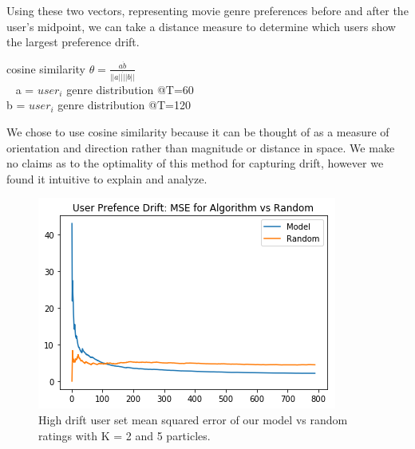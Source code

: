 \documentclass{article}
\begin{document}
Using these two vectors, representing movie genre preferences before and after the user's midpoint, we can take a distance measure to determine which users show the largest preference drift.

\begin{center}
cosine similarity $\theta = \frac{a \dot b}{||a|| \dot ||b||}$ \\
\ \newline
a = $user_i$ genre distribution @T=60 \\
b = $user_i$ genre distribution @T=120 \\
\end{center}

We chose to use cosine similarity because it can be thought of as a measure of orientation and direction rather than magnitude or distance in space. We make no claims as to the optimality of this method for capturing drift, however we found it intuitive to explain and analyze. 

\begin{figure}[ht]

\begin{center}
\centerline{\includegraphics[width=\columnwidth]{drift_MSE}}
\caption{High drift user set mean squared error of our model vs random ratings with K = 2 and 5 particles.}
\label{drift_MSE}
\end{center}

\vskip -0.2in
\end{figure}
\end{document}
